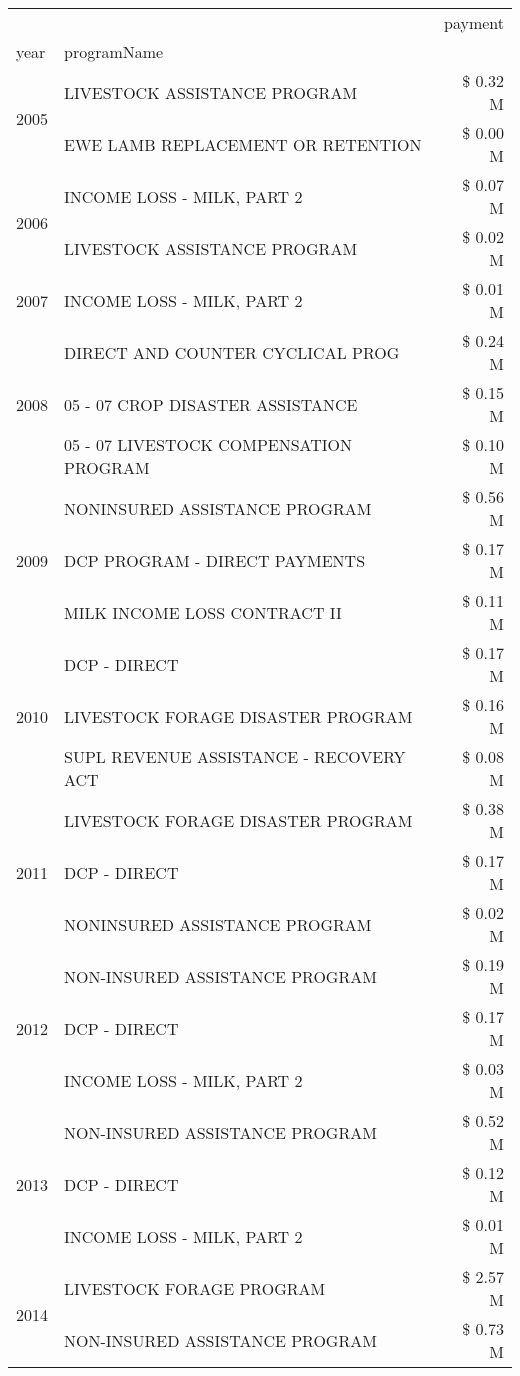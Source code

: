 \begin{tabular}{llr}
\toprule
 &  & payment \\
year & programName &  \\
\midrule
\multirow[t]{2}{*}{2005} & LIVESTOCK ASSISTANCE PROGRAM & \$ 0.32 M \\
 & EWE LAMB REPLACEMENT OR RETENTION & \$ 0.00 M \\
\cline{1-3}
\multirow[t]{2}{*}{2006} & INCOME LOSS - MILK, PART 2 & \$ 0.07 M \\
 & LIVESTOCK ASSISTANCE PROGRAM & \$ 0.02 M \\
\cline{1-3}
2007 & INCOME LOSS - MILK, PART 2 & \$ 0.01 M \\
\cline{1-3}
\multirow[t]{3}{*}{2008} & DIRECT AND COUNTER CYCLICAL PROG & \$ 0.24 M \\
 & 05 - 07 CROP DISASTER ASSISTANCE & \$ 0.15 M \\
 & 05 - 07 LIVESTOCK COMPENSATION PROGRAM & \$ 0.10 M \\
\cline{1-3}
\multirow[t]{3}{*}{2009} & NONINSURED ASSISTANCE PROGRAM & \$ 0.56 M \\
 & DCP PROGRAM - DIRECT PAYMENTS & \$ 0.17 M \\
 & MILK INCOME LOSS CONTRACT II & \$ 0.11 M \\
\cline{1-3}
\multirow[t]{3}{*}{2010} & DCP - DIRECT & \$ 0.17 M \\
 & LIVESTOCK FORAGE DISASTER PROGRAM & \$ 0.16 M \\
 & SUPL REVENUE ASSISTANCE - RECOVERY ACT & \$ 0.08 M \\
\cline{1-3}
\multirow[t]{3}{*}{2011} & LIVESTOCK FORAGE DISASTER PROGRAM & \$ 0.38 M \\
 & DCP - DIRECT & \$ 0.17 M \\
 & NONINSURED ASSISTANCE PROGRAM & \$ 0.02 M \\
\cline{1-3}
\multirow[t]{3}{*}{2012} & NON-INSURED ASSISTANCE PROGRAM & \$ 0.19 M \\
 & DCP - DIRECT & \$ 0.17 M \\
 & INCOME LOSS - MILK, PART 2 & \$ 0.03 M \\
\cline{1-3}
\multirow[t]{3}{*}{2013} & NON-INSURED ASSISTANCE PROGRAM & \$ 0.52 M \\
 & DCP - DIRECT & \$ 0.12 M \\
 & INCOME LOSS - MILK, PART 2 & \$ 0.01 M \\
\cline{1-3}
\multirow[t]{3}{*}{2014} & LIVESTOCK FORAGE PROGRAM & \$ 2.57 M \\
 & NON-INSURED ASSISTANCE PROGRAM & \$ 0.73 M \\

\end{tabular}
